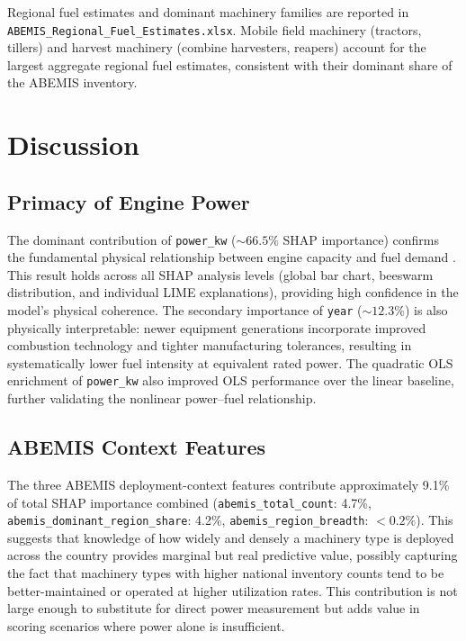 \documentclass[conference]{IEEEtran}
\begin{document}
Regional fuel estimates and dominant machinery families are reported in \texttt{ABEMIS\_Regional\_Fuel\_Estimates.xlsx}. Mobile field machinery (tractors, tillers) and harvest machinery (combine harvesters, reapers) account for the largest aggregate regional fuel estimates, consistent with their dominant share of the ABEMIS inventory.

\section{Discussion}

\subsection{Primacy of Engine Power}

The dominant contribution of \texttt{power\_kw} (${\sim}66.5\%$ SHAP importance) confirms the fundamental physical relationship between engine capacity and fuel demand \cite{domsch1999fuel}. This result holds across all SHAP analysis levels (global bar chart, beeswarm distribution, and individual LIME explanations), providing high confidence in the model's physical coherence. The secondary importance of \texttt{year} (${\sim}12.3\%$) is also physically interpretable: newer equipment generations incorporate improved combustion technology and tighter manufacturing tolerances, resulting in systematically lower fuel intensity at equivalent rated power. The quadratic OLS enrichment of \texttt{power\_kw} also improved OLS performance over the linear baseline, further validating the nonlinear power--fuel relationship.

\subsection{ABEMIS Context Features}

The three ABEMIS deployment-context features contribute approximately 9.1\% of total SHAP importance combined (\texttt{abemis\_total\_count}: 4.7\%, \texttt{abemis\_dominant\_region\_share}: 4.2\%, \texttt{abemis\_region\_breadth}: $< 0.2\%$). This suggests that knowledge of how widely and densely a machinery type is deployed across the country provides marginal but real predictive value, possibly capturing the fact that machinery types with higher national inventory counts tend to be better-maintained or operated at higher utilization rates. This contribution is not large enough to substitute for direct power measurement but adds value in scoring scenarios where power alone is insufficient.
\end{document}

